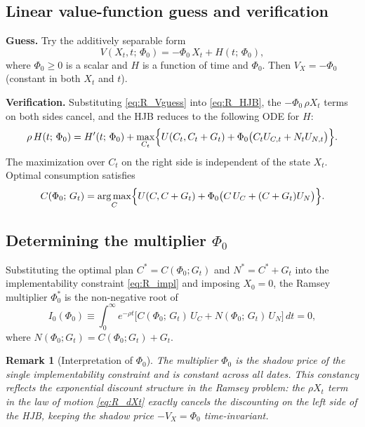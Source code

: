 \documentclass[12pt]{article}
\DeclareMathOperator*{\argmax}{arg\,max}
\newtheorem{remark}{Remark}
\begin{document}
\subsection{Linear value-function guess and verification}

\noindent\textbf{Guess.}  Try the additively separable form
\begin{equation}\label{eq:R_Vguess}
  V(X_t, t;\, \Phi_0) = -\Phi_0\, X_t + H(t;\, \Phi_0),
\end{equation}
where $\Phi_0 \ge 0$ is a scalar and $H$ is a function of time and $\Phi_0$.
Then $V_X = -\Phi_0$ (constant in both $X_t$ and $t$).

\medskip\noindent\textbf{Verification.}  Substituting \eqref{eq:R_Vguess}
into \eqref{eq:R_HJB}, the $-\Phi_0\, \rho X_t$ terms on both sides cancel,
and the HJB reduces to the following ODE for $H$:
\begin{equation}\label{eq:R_Hode}
  \rho\, H(t;\, \Phi_0) = H'(t;\, \Phi_0)
  + \max_{C_t}\Bigl\{U(C_t, C_t+G_t)
  + \Phi_0\bigl(C_t U_{C,t} + N_t U_{N,t}\bigr)\Bigr\}.
\end{equation}
The maximization over $C_t$ on the right side is independent of the state
$X_t$.  Optimal consumption satisfies
\begin{equation}\label{eq:R_Copt}
  C(\Phi_0;\, G_t) = \argmax_{C} \Bigl\{U(C, C+G_t)
  + \Phi_0\bigl(C\, U_C + (C+G_t) U_N\bigr)\Bigr\}.
\end{equation}

\subsection{Determining the multiplier $\Phi_0$}

Substituting the optimal plan $C^* = C(\Phi_0; G_t)$ and $N^* = C^* + G_t$ into
the implementability constraint \eqref{eq:R_impl} and imposing $X_0 = 0$,
the Ramsey multiplier $\Phi_0^*$ is the non-negative root of
\begin{equation}\label{eq:R_IC}
  I_0(\Phi_0) \equiv
  \int_0^\infty e^{-\rho t}\bigl[C(\Phi_0;\, G_t)\, U_C + N(\Phi_0;\, G_t)\, U_N\bigr]\, dt
  = 0,
\end{equation}
where $N(\Phi_0; G_t) = C(\Phi_0; G_t) + G_t$.

\medskip
\begin{remark}[Interpretation of $\Phi_0$]
The multiplier $\Phi_0$ is the shadow price of the single implementability
constraint and is \emph{constant across all dates}.  This constancy reflects
the exponential discount structure in the Ramsey problem: the $\rho X_t$ term
in the law of motion \eqref{eq:R_dXt} exactly cancels the discounting on the
left side of the HJB, keeping the shadow price $-V_X = \Phi_0$ time-invariant.
\end{remark}
\end{document}
